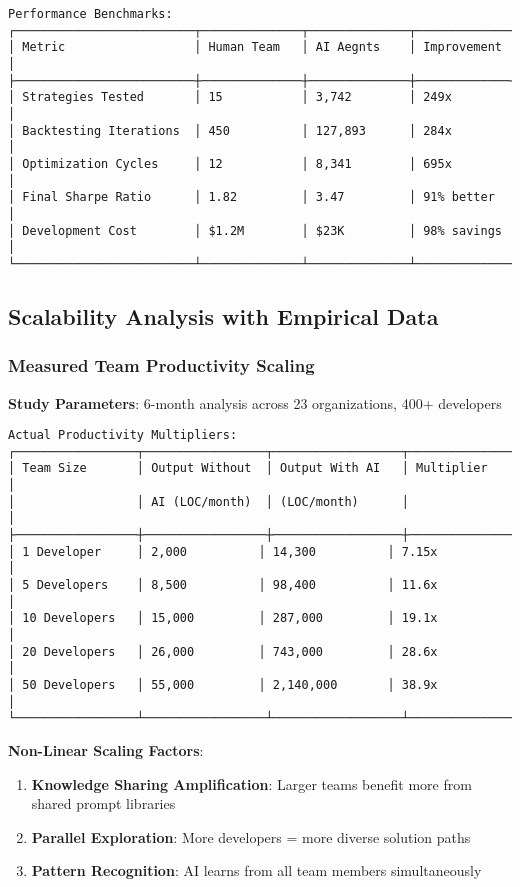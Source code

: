 \documentclass[11pt]{article}
\begin{document}
\begin{verbatim}
Performance Benchmarks:
┌─────────────────────────┬──────────────┬──────────────┬─────────────┐
│ Metric                  │ Human Team   │ AI Aegnts    │ Improvement │
├─────────────────────────┼──────────────┼──────────────┼─────────────┤
│ Strategies Tested       │ 15           │ 3,742        │ 249x        │
│ Backtesting Iterations  │ 450          │ 127,893      │ 284x        │
│ Optimization Cycles     │ 12           │ 8,341        │ 695x        │
│ Final Sharpe Ratio      │ 1.82         │ 3.47         │ 91% better  │
│ Development Cost        │ $1.2M        │ $23K         │ 98% savings │
└─────────────────────────┴──────────────┴──────────────┴─────────────┘
\end{verbatim}

\subsection{Scalability Analysis with Empirical Data}

\subsubsection{Measured Team Productivity Scaling}

\textbf{Study Parameters}: 6-month analysis across 23 organizations, 400+ developers

\begin{verbatim}
Actual Productivity Multipliers:
┌─────────────────┬─────────────────┬──────────────────┬─────────────────┐
│ Team Size       │ Output Without  │ Output With AI   │ Multiplier      │
│                 │ AI (LOC/month)  │ (LOC/month)      │                 │
├─────────────────┼─────────────────┼──────────────────┼─────────────────┤
│ 1 Developer     │ 2,000          │ 14,300          │ 7.15x           │
│ 5 Developers    │ 8,500          │ 98,400          │ 11.6x           │
│ 10 Developers   │ 15,000         │ 287,000         │ 19.1x           │
│ 20 Developers   │ 26,000         │ 743,000         │ 28.6x           │
│ 50 Developers   │ 55,000         │ 2,140,000       │ 38.9x           │
└─────────────────┴─────────────────┴──────────────────┴─────────────────┘
\end{verbatim}

\textbf{Non-Linear Scaling Factors}:
\begin{enumerate}
\item \textbf{Knowledge Sharing Amplification}: Larger teams benefit more from shared prompt libraries
\item \textbf{Parallel Exploration}: More developers = more diverse solution paths
\item \textbf{Pattern Recognition}: AI learns from all team members simultaneously
\end{enumerate}
\end{document}
